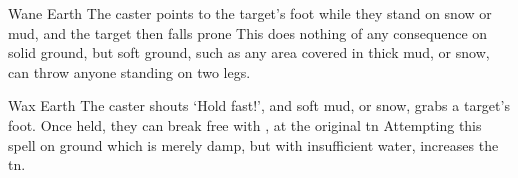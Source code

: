 \ifodd\value{diceNo}

  {}%
  {Wane}%
  {Earth}%
  {}%
  {The caster points to the target's foot while they stand on snow or mud, and the target then falls prone}%
  {
    This does nothing of any consequence on solid ground, but soft ground, such as any area covered in thick mud, or snow, can throw anyone standing on two legs.}

\else

  {}%
  {Wax}%
  {Earth}%
  {}%
  {The caster shouts `Hold fast!', and soft mud, or snow, grabs a target's foot.
  Once held, they can break free with , at the original \gls{tn}}%
  {
    Attempting this spell on ground which is merely damp, but with insufficient water, increases the \gls{tn}.
  }

\fi
{}
